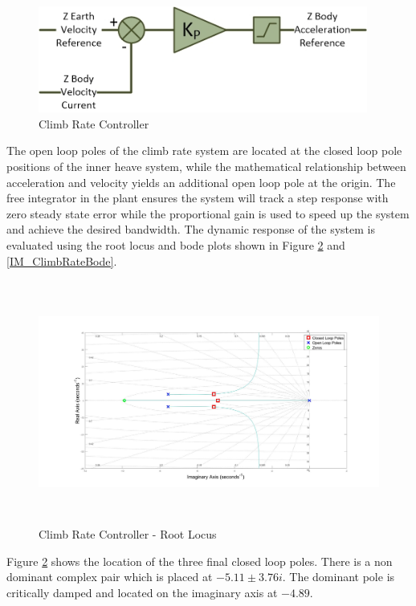 \documentclass[12pt]{report}
\begin{document}
\begin{figure}[H]
	\centering
	\includegraphics[height = 3.5cm]{../References/Diagrams/ClimbRateController.jpg}
	\caption{Climb Rate Controller}
	\label{IM_ClimbRateController}
\end{figure}		

The open loop poles of the climb rate system are located at the closed loop pole positions of the inner heave system, while the mathematical relationship between acceleration and velocity yields an additional open loop pole at the origin. The free integrator in the plant ensures the system will track a step response with zero steady state error while the proportional gain is used to speed up the system and achieve the desired bandwidth. The dynamic response of the system is evaluated using the root locus and bode plots shown in Figure \ref{IM_ClimbRateRoot} and \ref{IM_ClimbRateBode}.

\begin{figure}[H]
	\centering
	\includegraphics[height = 8cm]{../Design/Matlab/Controllers/climb_rate_root.jpg}
	\caption{Climb Rate Controller -  Root Locus}
	\label{IM_ClimbRateRoot}
\end{figure}

Figure \ref{IM_ClimbRateRoot} shows the location of the three final closed loop poles. There is a non dominant complex pair which is placed at $-5.11 \pm 3.76i$. The dominant pole is critically damped and located on the imaginary axis at $-4.89$.
\end{document}
